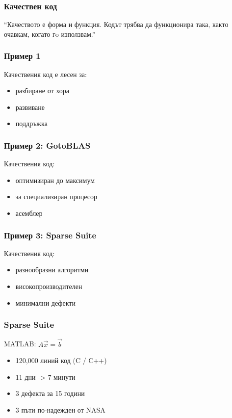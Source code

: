 \begin{frame}
  \frametitle{Качествен код}\pause

\begin{exampleblock}{}
  {\large ``Качеството е форма и функция. \pause Кодът трябва да функционира така, както очавкам, когато гo използвам.''}
\end{exampleblock}
\end{frame}


\begin{frame}
  \frametitle{Пример 1}
  Качествения код е лесен за:\pause
  \begin{itemize}
  \item разбиране от хора\pause
  \item развиване\pause
  \item поддръжка
  \end{itemize}
\end{frame}


\begin{frame}
  \frametitle{Пример 2: GotoBLAS}
  Качествения код:\pause
  \begin{itemize}
  \item оптимизиран до максимум\pause
  \item за специализиран процесор\pause
  \item асемблер
  \end{itemize}
\end{frame}


\begin{frame}
  \frametitle{Пример 3: Sparse Suite}
  Качествения код:\pause
  \begin{itemize}
  \item разнообразни алгоритми\pause
  \item високопроизводителен\pause
  \item минимални дефекти\pause
  \end{itemize}
\end{frame}


\begin{frame}
  \frametitle{Sparse Suite}
  MATLAB: $A \vec{x} = \vec{b}$ \pause
  \begin{itemize}
  \item 120,000 линий код (C / C++) \pause
  \item 11 дни -> 7 минути\pause
  \item 3 дефекта за 15 години\pause
  \item 3 пъти по-надежден от NASA
  \end{itemize}
\end{frame}
